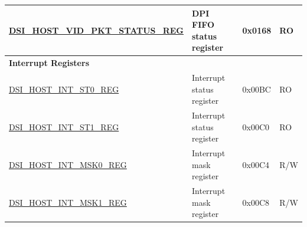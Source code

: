 \begin{longtable}{ | p{6.8cm} | p{7.2cm} | p{1.3cm} | p{1cm} | }
\hyperref[regdesc:DSIHOSTVIDPKTSTATUSREG]{DSI\_HOST\_VID\_PKT\_STATUS\_REG} & DPI FIFO status register & 0x0168 & RO \\ \hline
\multicolumn{4}{|l|}{\textbf{Interrupt Registers}} \\ \hline
\hyperref[regdesc:DSIHOSTINTST0REG]{DSI\_HOST\_INT\_ST0\_REG} & Interrupt status register & 0x00BC & RO \\ \hline
\hyperref[regdesc:DSIHOSTINTST1REG]{DSI\_HOST\_INT\_ST1\_REG} & Interrupt status register & 0x00C0 & RO \\ \hline
\hyperref[regdesc:DSIHOSTINTMSK0REG]{DSI\_HOST\_INT\_MSK0\_REG} & Interrupt mask register & 0x00C4 & R/W \\ \hline
\hyperref[regdesc:DSIHOSTINTMSK1REG]{DSI\_HOST\_INT\_MSK1\_REG} & Interrupt mask register & 0x00C8 & R/W \\ \hline
\end{longtable}
